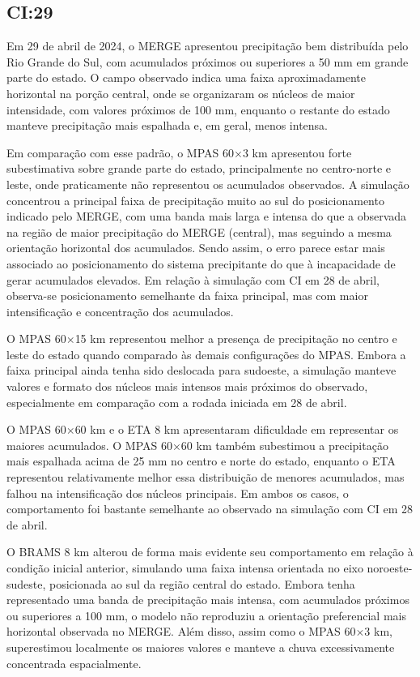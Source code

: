\documentclass[12pt,a4paper,oneside]{book}
\begin{document}
\subsection{CI:29}

Em 29 de abril de 2024, o MERGE apresentou precipitação bem distribuída pelo Rio Grande do Sul, com acumulados próximos ou superiores a 50 mm em grande parte do estado. O campo observado indica uma faixa aproximadamente horizontal na porção central, onde se organizaram os núcleos de maior intensidade, com valores próximos de 100 mm, enquanto o restante do estado manteve precipitação mais espalhada e, em geral, menos intensa.

Em comparação com esse padrão, o MPAS 60$\times$3 km apresentou forte subestimativa sobre grande parte do estado, principalmente no centro-norte e leste, onde praticamente não representou os acumulados observados. A simulação concentrou a principal faixa de precipitação muito ao sul do posicionamento indicado pelo MERGE, com uma banda mais larga e intensa do que a observada na região de maior precipitação do MERGE (central), mas seguindo a mesma orientação horizontal dos acumulados. Sendo assim, o erro parece estar mais associado ao posicionamento do sistema precipitante do que à incapacidade de gerar acumulados elevados. Em relação à simulação com CI em 28 de abril, observa-se posicionamento semelhante da faixa principal, mas com maior intensificação e concentração dos acumulados.

O MPAS 60$\times$15 km representou melhor a presença de precipitação no centro e leste do estado quando comparado às demais configurações do MPAS. Embora a faixa principal ainda tenha sido deslocada para sudoeste, a simulação manteve valores e formato dos núcleos mais intensos mais próximos do observado, especialmente em comparação com a rodada iniciada em 28 de abril.

O MPAS 60$\times$60 km e o ETA 8 km apresentaram dificuldade em representar os maiores acumulados. O MPAS 60$\times$60 km também subestimou a precipitação mais espalhada acima de 25 mm no centro e norte do estado, enquanto o ETA representou relativamente melhor essa distribuição de menores acumulados, mas falhou na intensificação dos núcleos principais. Em ambos os casos, o comportamento foi bastante semelhante ao observado na simulação com CI em 28 de abril.

O BRAMS 8 km alterou de forma mais evidente seu comportamento em relação à condição inicial anterior, simulando uma faixa intensa orientada no eixo noroeste-sudeste, posicionada ao sul da região central do estado. Embora tenha representado uma banda de precipitação mais intensa, com acumulados próximos ou superiores a 100 mm, o modelo não reproduziu a orientação preferencial mais horizontal observada no MERGE. Além disso, assim como o MPAS 60$\times$3 km, superestimou localmente os maiores valores e manteve a chuva excessivamente concentrada espacialmente.
\end{document}
